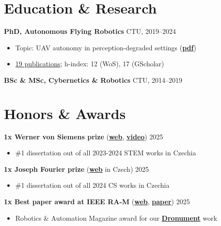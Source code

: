 \documentclass[12pt,a4paper]{article}
\newcommand\Colorhreff[3][reff]{\href{#2}{\color{#1}#3}}
\newcommand{\bluesquare}{\raisebox{0.5ex}{\textcolor{primary}{\rule{0.5ex}{0.5ex}}}}
\newcommand{\parskipheader}{-0.0cm}
\newcommand{\parskipsmall}{0.02cm}
\begin{document}
\begin{paracol}{2}
\vspace{\parskipheader}
\section*{Education \& Research}
\textbf{PhD, Autonomous Flying Robotics} \hfill CTU, 2019–2024
\begin{itemize}[label=\bluesquare, left=0.5em]
  \item Topic: UAV autonomy in perception-degraded settings (\Colorhreff{https://mrs.fel.cvut.cz/data/papers/petracek_phd_thesis.pdf}{\textbf{pdf}})
  \item \Colorhreff{https://raw.githubusercontent.com/petrapa6/cv/master/academic_cv.pdf}{19 publications}; h-index: 12 (WoS), 17 (GScholar)
\end{itemize}

\vspace{\parskipsmall}
\noindent
\textbf{BSc \& MSc, Cybernetics \& Robotics} \hfill CTU, 2014–2019

\vspace{\parskipheader}
\section*{Honors \& Awards}
\textbf{1x Werner von Siemens prize} (\Colorhreff{https://www.cenasiemens.cz/minule-rocniky/vitezove-2024/\#disertacni-prace}{\textbf{web}}, \Colorhreff{https://www.youtube.com/watch?v=idnDA4Ap-J4}{\textbf{video}}) \hfill 2025
\begin{itemize}
  \item \#1 dissertation out of all 2023-2024 STEM works in Czechia
\end{itemize}

\vspace{\parskipsmall}
\noindent
\textbf{1x Joseph Fourier prize} (\Colorhreff{https://feedit.cz/2025/06/26/vymyslel-zpusob-jak-mohou-drony-letat-uvnitr-budov-mlady-cesky-vedec-za-to-ziskal-cenu-josepha-fouriera-a-staz-ve-francii/}{\textbf{web}} in Czech) \hfill 2025
\begin{itemize}
  \item \#1 dissertation out of all 2024 CS works in Czechia
\end{itemize}

\vspace{\parskipsmall}
\noindent
\textbf{1x Best paper award at IEEE RA-M} (\Colorhreff{https://www.linkedin.com/posts/mrsgroupprague_icra2025-robotics-dronetechnology-activity-7332784284316962816-kg45}{\textbf{web}}, \Colorhreff{https://mrs.fel.cvut.cz/data/papers/petracek2023ram.pdf}{\textbf{paper}}) \hfill 2025
\begin{itemize}
  \item Robotics \& Automation Magazine award for our \Colorhreff{https://www.youtube.com/watch?v=Gx-mBklSbYc}{\textbf{Dronument}} work
\end{itemize}


\end{paracol}
\end{document}
